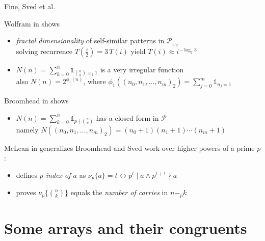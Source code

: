 \documentclass[10pt,serif, professionalfont]{beamer}
\begin{document}
\begin{frame}{Fine, Sved et al.}
    \begin{block}{Wolfram in \cite{Wolfram1984} shows}
        \begin{itemize}
            \item {\normalsize \emph{fractal dimensionality} of self-similar patterns in $\mathcal{P}_{\equiv_{2}}$}\\
                \footnotesize{solving recurrence $T(\frac{i}{2})=3\,T(i)$ yield $T(i)\approx i^{-\log_{2}{3}}$}
            \item {\normalsize $N(n)=\sum_{k=0}^{n}{\mathbb{1}_{{{n}\choose{k}}\equiv_{2}1}}$ is a very irregular function }\\
                \footnotesize{also $N(n)=2^{\phi_{1}(n)}$, where $ \phi_{1}((n_{0},n_{1},\ldots,n_{m})_{2})=
                    \sum_{j=0}^{m}{\mathbb{1}_{n_{j}=1} }$}
        \end{itemize}
    \end{block}
    \pause
    \begin{block}{Broomhead in \cite{Broomhead1972} shows}
        \begin{itemize}
            \item {\normalsize $N(n)=\sum_{k=0}^{n}{\mathbb{1}_{p\nmid{{n}\choose{k}}}}$ has a closed form in $\mathcal{P}$}\\
                \footnotesize{namely $N((n_{0},n_{1},\ldots,n_{m})_{2})=(n_{0}+1)(n_{1}+1)\cdots(n_{m}+1)$}
        \end{itemize}
    \end{block}
    \pause
    \begin{block}{McLean in \cite{Lean1974} generalizes}
        Broomhead and Sved work over higher powers of a prime $p$:
        \begin{itemize}
            \item defines \emph{$p$-index of $a$} as {$\nu_{p}\lbrace a\rbrace =t \leftrightarrow p^{t}\mid a \wedge p^{t+1}\nmid a$}
            \item proves {$\nu_{p}\lbrace {{n}\choose{k}}\rbrace $} equals the \emph{number of carries} in $n-_{p}k$
        \end{itemize}
    \end{block}
\end{frame}

\section{Some arrays and their congruents}
\end{document}
